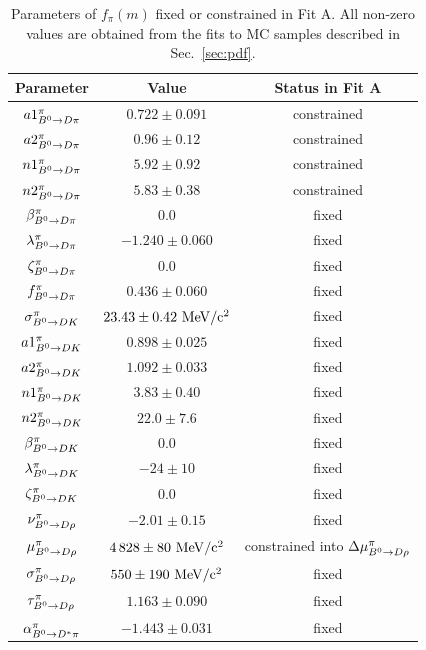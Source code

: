 \begin{table}
	\begin{center}
		\caption{Parameters of $f_{\pi}(m)$ fixed or constrained in Fit A. All non-zero values are obtained
		from the fits to MC samples described in Sec.~\ref{sec:pdf}.}
		\begin{tabular}{ccc}
			\toprule
			Parameter & Value & Status in Fit A\\
			\hline
			$a1^{\pi}_{B^0\rightarrow D\pi}$ & $0.722\pm0.091$ & constrained \\
			$a2^{\pi}_{B^0\rightarrow D\pi}$ & $0.96\pm0.12$ & constrained \\
			$n1^{\pi}_{B^0\rightarrow D\pi}$ & $5.92\pm0.92$ & constrained \\
			$n2^{\pi}_{B^0\rightarrow D\pi}$ & $5.83\pm0.38$ & constrained \\
	                $\beta^{\pi}_{B^0\rightarrow D\pi}$ & $0.0$ & fixed\\
			$\lambda^{\pi}_{B^0\rightarrow D\pi}$ & $-1.240\pm0.060$ & fixed\\
			$\zeta^{\pi}_{B^0\rightarrow D\pi}$ & $0.0$ & fixed\\
                        $f^{\pi}_{B^0\rightarrow D\pi}$ & $0.436\pm0.060$ & fixed\\ 
			\hline
			$\sigma^{\pi}_{B^0\rightarrow DK}$ & $23.43\pm0.42~\rm MeV/c^{2}$ & fixed\\
			$a1^{\pi}_{B^0\rightarrow DK}$ & $0.898\pm0.025$ & fixed\\
			$a2^{\pi}_{B^0\rightarrow DK}$ & $1.092\pm0.033$ & fixed\\
			$n1^{\pi}_{B^0\rightarrow DK}$ & $3.83\pm0.40$ & fixed\\
			$n2^{\pi}_{B^0\rightarrow DK}$ & $22.0\pm7.6$ & fixed\\
			$\beta^{\pi}_{B^0\rightarrow DK}$ & $0.0$ & fixed\\
			$\lambda^{\pi}_{B^0\rightarrow DK}$ & $-24\pm10$ & fixed\\
			$\zeta^{\pi}_{B^0\rightarrow DK}$ & $0.0$ & fixed\\
			\hline
			$\nu^{\pi}_{B^0\rightarrow D\rho}$ & $-2.01\pm0.15$ & fixed\\
			$\mu^{\pi}_{B^0\rightarrow D\rho}$ & $4\,828\pm80~\rm MeV/c^{2}$ & constrained into $\Delta\mu^{\pi}_{B^0\rightarrow D\rho}$\\
			$\sigma^{\pi}_{B^0\rightarrow D\rho}$ & $550\pm190~\rm MeV/c^{2}$ & fixed\\
			$\tau^{\pi}_{B^0\rightarrow D\rho}$ & $1.163\pm0.090$ & fixed\\
			\hline
			$\alpha^{\pi}_{B^0\rightarrow D^*\pi}$ & $-1.443\pm0.031$ & fixed\\

\end{tabular}
\end{center}
\end{table}
